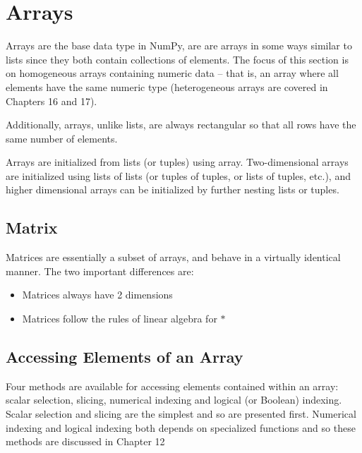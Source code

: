 \documentclass[KSmain.tex]{subfiles}
\begin{document}
 

\section{Arrays}
Arrays are the base data type in NumPy, are are arrays in some ways similar to lists since they both contain
collections of elements. The focus of this section is on homogeneous arrays containing numeric data
– that is, an array where all elements have the same numeric type (heterogeneous arrays are covered in
Chapters 16 and 17). 

Additionally, arrays, unlike lists, are always rectangular so that all rows have the same
number of elements.

Arrays are initialized from lists (or tuples) using array. Two-dimensional arrays are initialized using
lists of lists (or tuples of tuples, or lists of tuples, etc.), and higher dimensional arrays can be initialized by
further nesting lists or tuples.

\subsection{Matrix}
Matrices are essentially a subset of arrays, and behave in a virtually identical manner. The two important
differences are:

\begin{itemize}
\item Matrices always have 2 dimensions
\item Matrices follow the rules of linear algebra for $\ast$
\end{itemize}

\newpage

\subsection{Accessing Elements of an Array}
Four methods are available for accessing elements contained within an array: scalar selection, slicing,
numerical indexing and logical (or Boolean) indexing. Scalar selection and slicing are the simplest and so
are presented first. Numerical indexing and logical indexing both depends on specialized functions and
so these methods are discussed in Chapter 12



\end{document}
